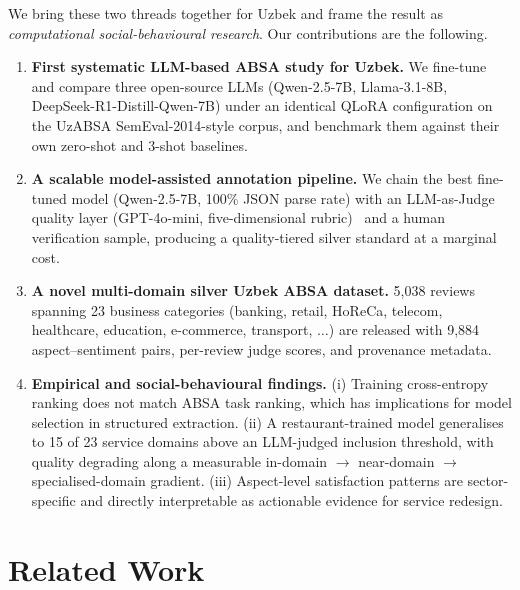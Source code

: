 \documentclass[runningheads]{llncs}
\begin{document}
We bring these two threads together for Uzbek and frame the result as
\emph{computational social-behavioural research}. Our contributions are the
following.

\begin{enumerate}
\item \textbf{First systematic LLM-based ABSA study for Uzbek.} We fine-tune
and compare three open-source LLMs (Qwen-2.5-7B, Llama-3.1-8B,
DeepSeek-R1-Distill-Qwen-7B) under an identical QLoRA configuration on the
UzABSA SemEval-2014-style corpus, and benchmark them against their own
zero-shot and 3-shot baselines.

\item \textbf{A scalable model-assisted annotation pipeline.} We chain the
best fine-tuned model (Qwen-2.5-7B, 100\% JSON parse rate) with an
LLM-as-Judge quality layer (GPT-4o-mini, five-dimensional
rubric)~\cite{10.5555/3666122.3668142,2506.22316} and a human verification
sample, producing a quality-tiered silver standard at a marginal cost.

\item \textbf{A novel multi-domain silver Uzbek ABSA dataset.} 5{,}038
reviews spanning 23 business categories (banking, retail, HoReCa, telecom,
healthcare, education, e-commerce, transport, $\ldots$) are released with
9{,}884 aspect--sentiment pairs, per-review judge scores, and provenance
metadata.

\item \textbf{Empirical and social-behavioural findings.} (i) Training
cross-entropy ranking does not match ABSA task ranking, which has
implications for model selection in structured extraction. (ii) A
restaurant-trained model generalises to 15 of 23 service domains above an
LLM-judged inclusion threshold, with quality degrading along a measurable
in-domain $\to$ near-domain $\to$ specialised-domain gradient. (iii)
Aspect-level satisfaction patterns are sector-specific and directly
interpretable as actionable evidence for service redesign.
\end{enumerate}


\section{Related Work}
\label{sec:related}
\end{document}
